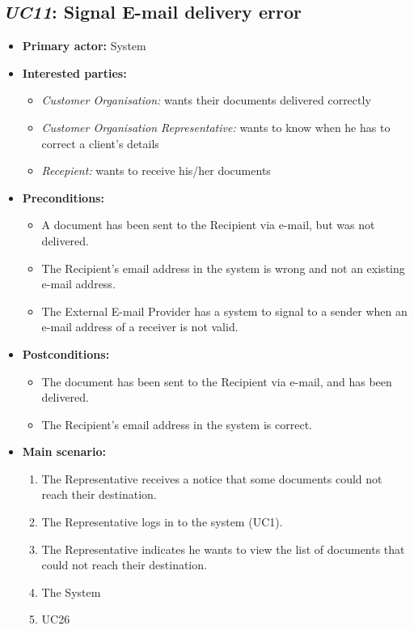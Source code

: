 \documentclass[a4paper,10pt]{article}
\begin{document}
\subsection{\emph{UC11}: Signal E-mail delivery error}
\begin{itemize}
    \item \textbf{Primary actor:} System
    \item \textbf{Interested parties:} 
        \begin{itemize}
            \item \textit{Customer Organisation:} wants their documents delivered correctly
            \item \textit{Customer Organisation Representative:} wants to know when he has to correct a client's details
            \item \textit{Recepient:} wants to receive his/her documents
        \end{itemize}

    \item \textbf{Preconditions:}
        \begin{itemize}
            \item A document has been sent to the Recipient via e-mail, but was not delivered.
            \item The Recipient's email address in the system is wrong and not an existing e-mail address.
            \item The External E-mail Provider has a system to signal to a sender when an e-mail address of a receiver is not valid.
        \end{itemize}

    \item \textbf{Postconditions:}
        \begin{itemize}
            \item The document has been sent to the Recipient via e-mail, and has been delivered.
            \item The Recipient's email address in the system is correct.
        \end{itemize}
        
    \item \textbf{Main scenario:} 
    \begin{enumerate}
       \item The Representative receives a notice that some documents could not reach their destination.
       \item The Representative logs in to the system (UC1).
       \item The Representative indicates he wants to view the list of documents that could not reach their destination.
       \item The System
       \item UC26
    \end{enumerate}


\end{itemize}
\end{document}
